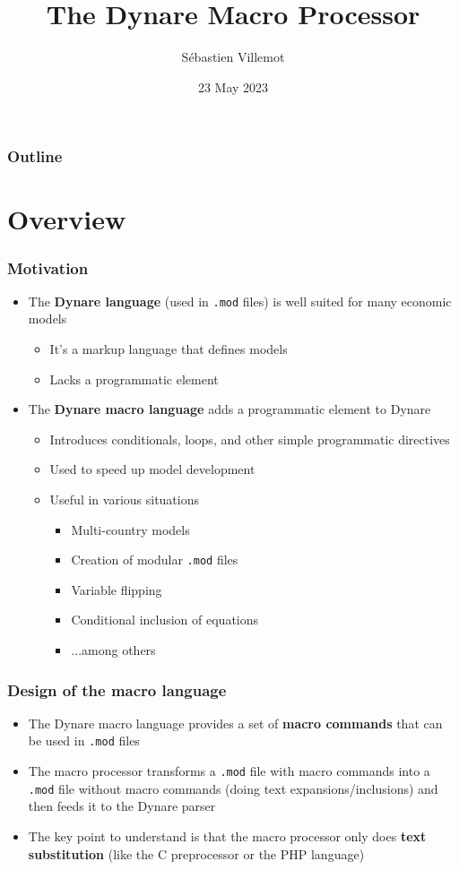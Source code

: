 \documentclass[aspectratio=169]{beamer}
\title{The Dynare Macro Processor}
\author{Sébastien Villemot}
\institute[Dynare Team]{\pgfuseimage{logo}}
\date{23 May 2023}
\begin{document}
\begin{frame}
  \titlepage
\end{frame}

\begin{frame}
  \frametitle{Outline}
  \tableofcontents
\end{frame}

\section{Overview}

\begin{frame}
  \frametitle{Motivation}
  \begin{itemize}
  \item The \textbf{Dynare language} (used in \texttt{.mod} files) is well suited for many economic models
    \begin{itemize}
    \item It's a markup language that defines models
    \item Lacks a programmatic element
    \end{itemize}
  \item The \textbf{Dynare macro language} adds a programmatic element to Dynare
    \begin{itemize}
    \item Introduces conditionals, loops, and other simple programmatic directives
    \item Used to speed up model development
    \item Useful in various situations
      \begin{itemize}
      \item Multi-country models
      \item Creation of modular \texttt{.mod} files
      \item Variable flipping
      \item Conditional inclusion of equations
      \item ...among others
      \end{itemize}
    \end{itemize}
  \end{itemize}
\end{frame}

\begin{frame}
  \frametitle{Design of the macro language}
  \begin{itemize}
  \item The Dynare macro language provides a set of \textbf{macro commands} that can be used in \texttt{.mod} files
  \item The macro processor transforms a \texttt{.mod} file with macro commands into a \texttt{.mod} file without macro commands (doing text expansions/inclusions) and then feeds it to the Dynare parser
  \item The key point to understand is that the macro processor only does \textbf{text substitution} (like the C preprocessor or the PHP language)
  \end{itemize}
\end{frame}
\end{document}
